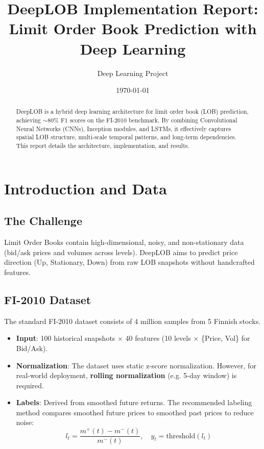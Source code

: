 \documentclass[10pt]{article}
\title{DeepLOB Implementation Report: Limit Order Book Prediction with Deep Learning}
\author{Deep Learning Project}
\date{\today}
\begin{document}
\maketitle

\begin{abstract}

DeepLOB is a hybrid deep learning architecture for limit order book (LOB) prediction, achieving $\sim$80\% F1 scores on the FI-2010 benchmark. By combining Convolutional Neural Networks (CNNs), Inception modules, and LSTMs, it effectively captures spatial LOB structure, multi-scale temporal patterns, and long-term dependencies. This report details the architecture, implementation, and results.

\end{abstract}

\section{Introduction and Data}

\subsection{The Challenge}
Limit Order Books contain high-dimensional, noisy, and non-stationary data (bid/ask prices and volumes across levels). DeepLOB aims to predict price direction (Up, Stationary, Down) from raw LOB snapshots without handcrafted features.

\subsection{FI-2010 Dataset}
The standard FI-2010 dataset consists of 4 million samples from 5 Finnish stocks.
\begin{itemize}
    \item \textbf{Input}: 100 historical snapshots $\times$ 40 features (10 levels $\times$ \{Price, Vol\} for Bid/Ask).
    \item \textbf{Normalization}: The dataset uses static z-score normalization. However, for real-world deployment, \textbf{rolling normalization} (e.g. 5-day window) is required.
    \item \textbf{Labels}: Derived from smoothed future returns. The recommended labeling method compares smoothed future prices to smoothed past prices to reduce noise:
    \[l_t = \frac{m^+(t) - m^-(t)}{m^-(t)}, \quad y_t = \text{threshold}(l_t)\]
\end{itemize}
\end{document}
